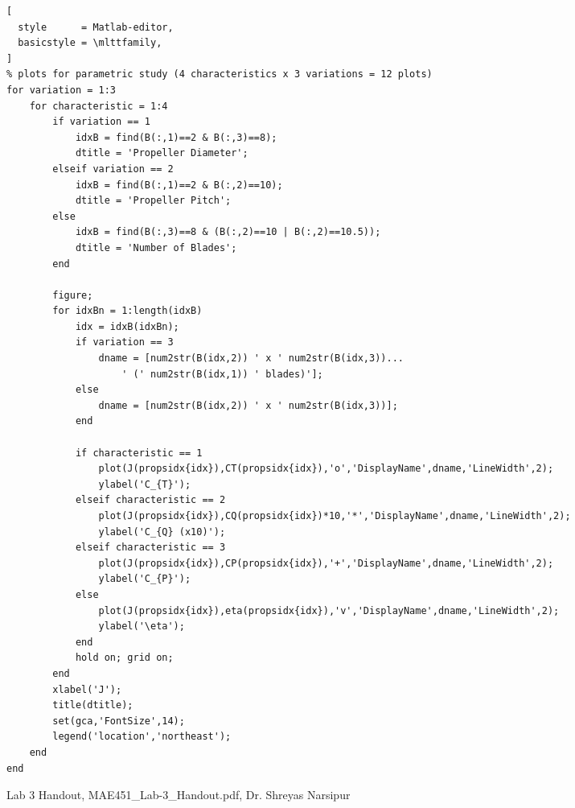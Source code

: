 \documentclass[]{aiaa-tc}%
\begin{document}
\begin{lstlisting}[
  style      = Matlab-editor,
  basicstyle = \mlttfamily,
]
% plots for parametric study (4 characteristics x 3 variations = 12 plots)
for variation = 1:3
	for characteristic = 1:4
		if variation == 1
			idxB = find(B(:,1)==2 & B(:,3)==8);
			dtitle = 'Propeller Diameter';
		elseif variation == 2
			idxB = find(B(:,1)==2 & B(:,2)==10);
			dtitle = 'Propeller Pitch';
		else
			idxB = find(B(:,3)==8 & (B(:,2)==10 | B(:,2)==10.5));
			dtitle = 'Number of Blades';
		end

		figure;
		for idxBn = 1:length(idxB)
			idx = idxB(idxBn);
			if variation == 3
				dname = [num2str(B(idx,2)) ' x ' num2str(B(idx,3))...
					' (' num2str(B(idx,1)) ' blades)'];
			else
				dname = [num2str(B(idx,2)) ' x ' num2str(B(idx,3))];
			end

			if characteristic == 1
				plot(J(propsidx{idx}),CT(propsidx{idx}),'o','DisplayName',dname,'LineWidth',2);
				ylabel('C_{T}');
			elseif characteristic == 2
				plot(J(propsidx{idx}),CQ(propsidx{idx})*10,'*','DisplayName',dname,'LineWidth',2);
				ylabel('C_{Q} (x10)');
			elseif characteristic == 3
				plot(J(propsidx{idx}),CP(propsidx{idx}),'+','DisplayName',dname,'LineWidth',2);
				ylabel('C_{P}');
			else
				plot(J(propsidx{idx}),eta(propsidx{idx}),'v','DisplayName',dname,'LineWidth',2);
				ylabel('\eta');
			end
			hold on; grid on;
		end
		xlabel('J');
		title(dtitle);
		set(gca,'FontSize',14);
		legend('location','northeast');
	end
end

\end{lstlisting}

\begin{thebibliography}{9}%

 Lab 3 Handout, MAE451\_Lab-3\_Handout.pdf, Dr. Shreyas Narsipur \\

\end{thebibliography}
\end{document}
